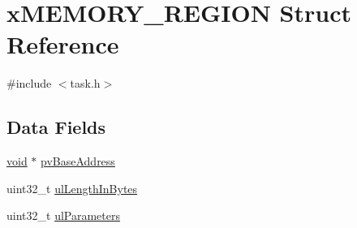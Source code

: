 \hypertarget{structxMEMORY__REGION}{\section{x\-M\-E\-M\-O\-R\-Y\-\_\-\-R\-E\-G\-I\-O\-N Struct Reference}
\label{structxMEMORY__REGION}
}


{\ttfamily \#include $<$task.\-h$>$}

\subsection*{Data Fields}
\begin{DoxyCompactItemize}
\item 
\hyperlink{Paradigm_2Tern__EE_2small_2portmacro_8h_a14d32f8130d3c0b212cfc751730b5b49}{void} $\ast$ \hyperlink{structxMEMORY__REGION_a228036bbfdbc38f170e45deadb166172}{pv\-Base\-Address}
\item 
uint32\-\_\-t \hyperlink{structxMEMORY__REGION_a97e59578d3c4c46270d33e7206258a65}{ul\-Length\-In\-Bytes}
\item 
uint32\-\_\-t \hyperlink{structxMEMORY__REGION_a6ba180553e9a318f23acc5f4664934e3}{ul\-Parameters}
\end{DoxyCompactItemize}


